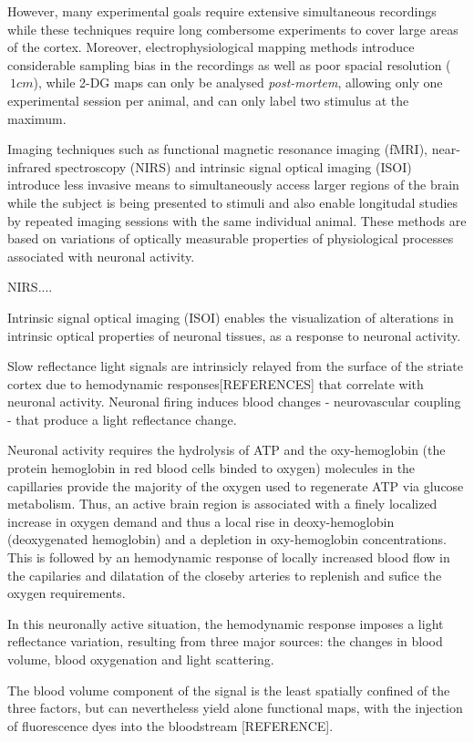 However, many experimental goals require extensive simultaneous recordings while these techniques require  long combersome experiments to cover large areas of the cortex. Moreover, electrophysiological mapping methods introduce considerable sampling bias in the recordings as well as poor spacial resolution ($~1 cm$), while 2-DG maps can only be analysed \textit{post-mortem}, allowing only one experimental session per animal, and can only label two stimulus at the maximum.

Imaging techniques such as functional magnetic resonance imaging (fMRI), near-infrared spectroscopy (NIRS) and intrinsic signal optical imaging (ISOI) introduce less invasive means to simultaneously access larger regions of the brain while the subject is being presented to stimuli and also enable longitudal studies by repeated imaging sessions with the same individual animal. These methods are based on variations of optically measurable properties of physiological processes associated with neuronal activity.

NIRS....

Intrinsic signal optical imaging (ISOI) enables the visualization of alterations in intrinsic optical properties of neuronal tissues, as a response to neuronal activity.

Slow reflectance light signals are intrinsicly relayed from the surface of the striate cortex due to hemodynamic responses[REFERENCES] that correlate with neuronal activity. Neuronal firing induces blood changes - neurovascular coupling - that produce a light reflectance change.

Neuronal activity requires the hydrolysis of ATP and the oxy-hemoglobin (the protein hemoglobin in red blood cells binded to oxygen) molecules in the capillaries provide the majority of the oxygen used to regenerate ATP via glucose metabolism. Thus, an active brain region is associated with a finely localized increase in oxygen demand and thus a local rise in deoxy-hemoglobin (deoxygenated hemoglobin) and a depletion in oxy-hemoglobin concentrations. This is followed by an hemodynamic response of locally increased blood flow in the capilaries and dilatation of the closeby arteries to replenish and sufice the oxygen requirements.

In this neuronally active situation, the hemodynamic response imposes a light reflectance variation, resulting from three major sources: the changes in blood volume, blood oxygenation and light scattering.

The blood volume component of the signal is the least spatially confined of the three factors, but can nevertheless yield alone functional maps, with the injection of fluorescence dyes into the bloodstream [REFERENCE].

